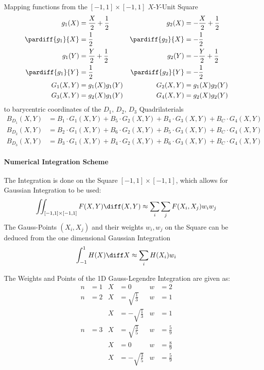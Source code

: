 \documentclass{mitschrift}
\begin{document}
Mapping functions from the $[-1,1] \times [-1,1]$ $X$-$Y$-Unit Square \begin{align}
    g_{1}(X) &= \frac{X}{2} + \frac{1}{2} & g_2(X) &= -\frac{X}{2} + \frac{1}{2} \\
    \pardiff{g_1}{X} &= \frac{1}{2} & \pardiff{g_2}{X} &= -\frac{1}{2} \\
    g_{1}(Y) &= \frac{Y}{2} + \frac{1}{2} & g_2(Y) &= -\frac{Y}{2} + \frac{1}{2} \\
    \pardiff{g_1}{Y} &= \frac{1}{2} & \pardiff{g_2}{Y} &= -\frac{1}{2} \\
    G_1(X,Y) &= g_1(X)g_1(Y) & G_2(X,Y) &= g_1(X)g_2(Y) \\
    G_3(X,Y) &= g_2(X)g_1(Y) & G_4(X,Y) &= g_2(X)g_2(Y)
\end{align} to barycentric coordinates of the $D_1,\, D_2,\, D_3$ Quadrilaterials \begin{align}
    B_{D_1}(X,Y) &= B_1 \cdot G_1(X,Y) + B_5 \cdot G_2(X,Y) + B_4 \cdot G_3(X,Y) + B_C \cdot G_4(X,Y) \label{eqn:DomainTrans1} \\
    B_{D_2}(X,Y) &= B_2 \cdot G_1(X,Y) + B_6 \cdot G_2(X,Y) + B_5 \cdot G_3(X,Y) + B_C \cdot G_4(X,Y) \label{eqn:DomainTrans2} \\
    B_{D_3}(X,Y) &= B_3 \cdot G_1(X,Y) + B_4 \cdot G_2(X,Y) + B_6 \cdot G_3(X,Y) + B_C \cdot G_4(X,Y) \label{eqn:DomainTrans3}
\end{align}

\paragraph{Numerical Integration Scheme}

The Integration is done on the Square $[-1,1] \times [-1, 1]$, which allows for Gaussian Integration to be used: \begin{equation}
    \iint_{[-1,1] \times [-1, 1]} F(X,Y) \diff (X,Y) \approx \sum_i \sum_j F(X_i,X_j) w_i w_j 
\end{equation}
The Gauss-Points $(X_i, X_j)$ and their weights $w_i,w_j$ on the Square can be deduced from the one dimensional Gaussian Integration \begin{equation}
    \int_{-1}^1 H(X) \diff X \approx \sum_i H(X_i) w_i
\end{equation}

The Weights and Points of the 1D Gauss-Legendre Integration are given as: \begin{align*}
    n &= 1 & X &= 0 & w &= 2 \\
    n &= 2 & X &= \sqrt{\frac{1}{3}} & w &= 1 \\
    & & X &= -\sqrt{\frac{1}{3}} & w &= 1 \\
    n &= 3 & X &= \sqrt{\frac{3}{5}} & w &= \frac{5}{9} \\
    & & X &= 0 & w &= \frac{8}{9} \\
    & & X &= -\sqrt{\frac{3}{5}} & w &= \frac{5}{9} \\
\end{align*}
\end{document}
